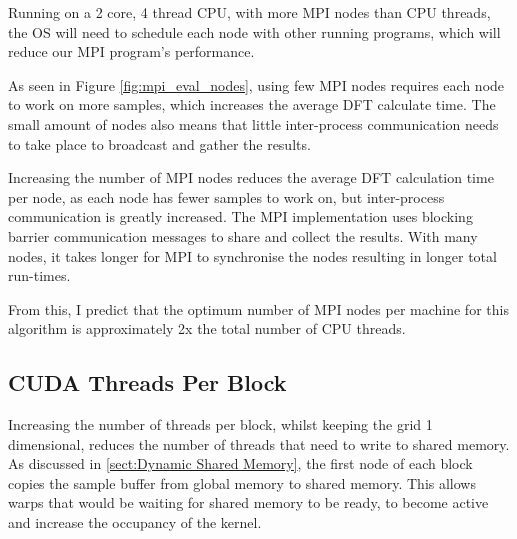 \documentclass[11pt,a4paper]{article}
\begin{document}
Running on a 2 core, 4 thread CPU, with more MPI nodes than CPU threads, the OS will need to schedule each node with other running programs, which will reduce our MPI program's performance.

As seen in Figure \ref{fig:mpi_eval_nodes}, using few MPI nodes requires each node to work on more samples, which increases the average DFT calculate time. The small amount of nodes also means that little inter-process communication needs to take place to broadcast and gather the results.

Increasing the number of MPI nodes reduces the average DFT calculation time per node, as each node has fewer samples to work on, but inter-process communication is greatly increased. The MPI implementation uses blocking barrier communication messages to share and collect the results. With many nodes, it takes longer for MPI to synchronise the nodes resulting in longer total run-times.

From this, I predict that the optimum number of MPI nodes per machine for this algorithm is approximately 2x the total number of CPU threads.

\subsection{CUDA Threads Per Block}
Increasing the number of threads per block, whilst keeping the grid 1 dimensional, reduces the number of threads that need to write to shared memory. As discussed in \ref{sect:Dynamic Shared Memory}, the first node of each block copies the sample buffer from global memory to shared memory. This allows warps that would be waiting for shared memory to be ready, to become active and increase the occupancy of the kernel.

\begin{figure}[H]%
    \centering
    \qquad
    \vspace{5pt}
    \caption{}%
    \label{fig:cuda_threads_per_block}%
\end{figure}
\end{document}
